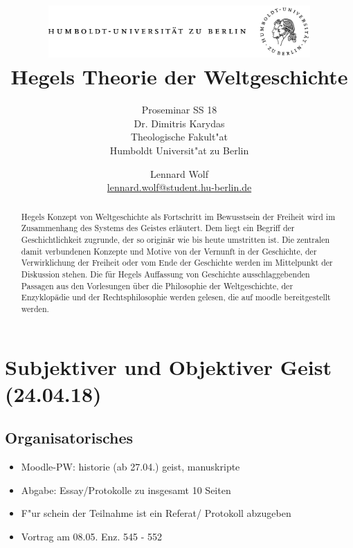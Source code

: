 \documentclass[emulatestandardclasses]{scrartcl}
\date{\vspace{-3ex}}
\begin{document}
\title{
	\includegraphics*[width=0.75\textwidth]{ErstesSem/images/hu_logo.png}\\
	\vspace{24pt}
	Hegels Theorie der Weltgeschichte}
\subtitle{Proseminar SS 18\\
          Dr. Dimitris Karydas\\
          Theologische Fakult"at \\ 
          Humboldt Universit"at zu Berlin}
\author{Lennard Wolf\\
        \small{\href{mailto:lennard.wolf@student.hu-berlin.de}{lennard.wolf@student.hu-berlin.de}}}
\maketitle
\begin{abstract}

Hegels Konzept von Weltgeschichte als Fortschritt im Bewusstsein der Freiheit wird im Zusammenhang des Systems des Geistes erläutert. Dem liegt ein Begriff der Geschichtlichkeit zugrunde, der so originär wie bis heute umstritten ist. Die zentralen damit verbundenen Konzepte und Motive von der Vernunft in der Geschichte, der Verwirklichung der Freiheit oder vom Ende der Geschichte werden im Mittelpunkt der Diskussion stehen. Die für Hegels Auffassung von Geschichte ausschlaggebenden Passagen aus den Vorlesungen über die Philosophie der Weltgeschichte, der Enzyklopädie und der Rechtsphilosophie werden gelesen, die auf moodle bereitgestellt werden.
\end{abstract}
\newpage

\tableofcontents
\listoffigures
\newpage


\section{Subjektiver und Objektiver Geist\\(24.04.18)}

\subsection{Organisatorisches}

\begin{itemize}
  \item Moodle-PW: historie (ab 27.04.) geist, manuskripte 
  \item Abgabe: Essay/Protokolle zu insgesamt 10 Seiten
  \item F"ur schein der Teilnahme ist ein Referat/ Protokoll abzugeben
  \item Vortrag am 08.05. Enz. 545 - 552
\end{itemize}
\end{document}
